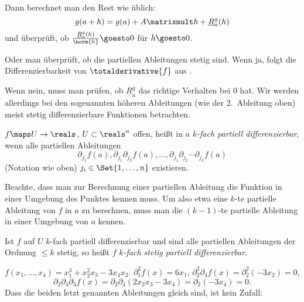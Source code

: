 Dann berechnet man den Rest wie üblich:
\begin{equation*}
  g(a+h)=g(a)+A\matrixmult h+ \underline{R}_a^g(h)
\end{equation*}
und überprüft, ob \( \frac{\underline{R}_a^g(h)}{\norm{h}}\goesto 0 \) für \( h\goesto 0 \).

Oder man überprüft, ob die partiellen Ableitungen stetig sind. Wenn ja, folgt die Differenzierbarkeit von \( \totalderivative{f} \) aus .

Wenn nein, muss man prüfen, ob \( \underline{R}_a^g \) das richtige Verhalten bei \( 0 \) hat. Wir werden allerdings bei den sogenannten höheren Ableitungen (wie der 2.\ Ableitung oben) meist stetig differenzierbare Funktionen betrachten.

\begin{definition}
  \( f\maps U\to \reals \), \( U\subset \reals^n \) offen, heißt in \( a \) \emph{\( k \)-fach partiell differenzierbar}, wenn alle partiellen Ableitungen
  \begin{equation*}
    \partial_{j_1} f(a), \partial_{j_1} \partial_{j_2} f(a),\dotsc, \partial_{j_1}\partial_{j_2}\dotsb\partial_{j_k} f(a)
  \end{equation*}
  (Notation wie oben) \( j_i\in \Set{1,\dotsc,n} \) existieren.
  \begin{achtung*}
    Beachte, dass man zur Berechnung einer partiellen Ableitung die Funktion in einer Umgebung des Punktes kennen muss. Um also etwa eine \( k \)-te partielle Ableitung von \( f \) in \( a \) zu berechnen, muss man die \( (k-1) \)-te partielle Ableitung in einer Umgebung von \( a \) kennen.
  \end{achtung*}
  Ist \( f \) auf \( U \) \( k \)-fach partiell differenzierbar und sind alle partiellen Ableitungen der Ordnung \( \leq k \) stetig, so heißt \( f \) \emph{\( k \)-fach stetig partiell differenzierbar}.
\end{definition}
\begin{beispiel*}
  \( f(x_1,\dotsc,x_4)=x_1^3+x_2^2x_3-3x_4x_2 \). \( \partial_1^2 f(x)=6x_1 \), \( \partial_2^2 \partial_4 f(x)=\partial_2^2(-3x_2)=0 \),
  \begin{equation*}
    \partial_2 \partial_4 \partial_3 f(x)=\partial_2 \partial_4 (2x_2 x_3-3x_4)=\partial_2 (-3x_4)=0.
  \end{equation*}
  Dass die beiden letzt genannten Ableitungen gleich sind, ist kein Zufall:
\end{beispiel*}
